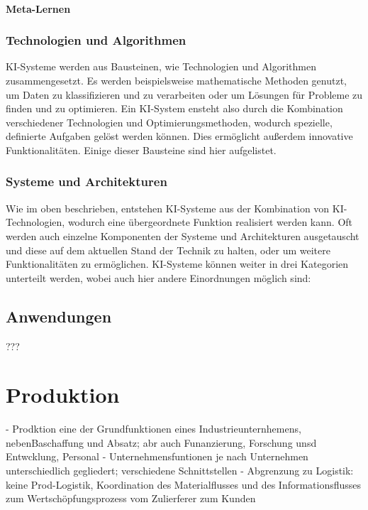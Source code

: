 \documentclass[a4paper,12pt, german]{report}
\begin{document}
\paragraph{Meta-Lernen}


\subsubsection{Technologien und Algorithmen}
KI-Systeme werden aus Bausteinen, wie Technologien und Algorithmen zusammengesetzt. Es werden beispielsweise mathematische Methoden genutzt, um Daten zu klassifizieren und zu verarbeiten oder um Lösungen für Probleme zu finden und zu optimieren. Ein KI-System ensteht also durch die Kombination verschiedener Technologien und Optimierungsmethoden, wodurch spezielle, definierte Aufgaben gelöst werden können. Dies ermöglicht außerdem innovative Funktionalitäten. Einige dieser Bausteine sind hier aufgelistet.


\subsubsection{Systeme und Architekturen}
Wie im oben beschrieben, entstehen KI-Systeme aus der Kombination von KI-Technologien, wodurch eine übergeordnete Funktion realisiert werden kann. Oft werden auch einzelne Komponenten der Systeme und Architekturen ausgetauscht und diese auf dem aktuellen Stand der Technik zu halten, oder um weitere Funktionalitäten zu ermöglichen. KI-Systeme können weiter in drei Kategorien unterteilt werden, wobei auch hier andere Einordnungen möglich sind:


\subsection{Anwendungen}
???


\section{Produktion}

- Prodktion eine der Grundfunktionen eines Industrieunternhemens, nebenBaschaffung und Absatz; abr auch Funanzierung, Forschung unsd Entwcklung, Personal 
- Unternehmensfuntionen je nach Unternehmen unterschiedlich gegliedert; verschiedene Schnittstellen
- Abgrenzung zu Logistik: keine Prod-Logistik, Koordination des Materialflusses und des Informationsflusses zum Wertschöpfungsprozess vom Zulierferer zum Kunden
\cite{07}
\end{document}
